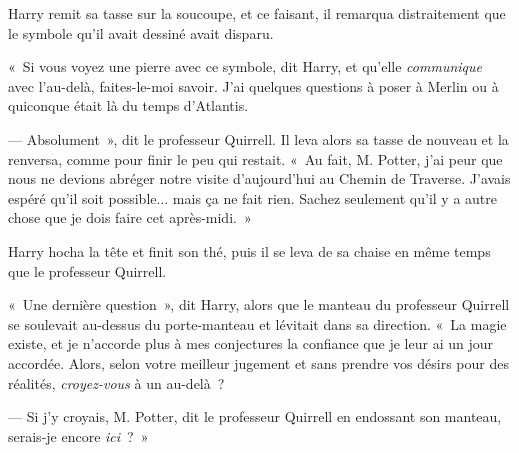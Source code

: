 Harry remit sa tasse sur la soucoupe, et ce faisant, il remarqua distraitement que le symbole qu'il avait dessiné avait disparu.

«~Si vous voyez une pierre avec ce symbole, dit Harry, et qu'elle \emph{communique} avec l'au-delà, faites-le-moi savoir. J'ai quelques questions à poser à Merlin ou à quiconque était là du temps d'Atlantis.

--- Absolument~», dit le professeur Quirrell. Il leva alors sa tasse de nouveau et la renversa, comme pour finir le peu qui restait. «~Au fait, M. Potter, j'ai peur que nous ne devions abréger notre visite d'aujourd'hui au Chemin de Traverse. J'avais espéré qu'il soit possible... mais ça ne fait rien. Sachez seulement qu'il y a autre chose que je dois faire cet après-midi.~»

Harry hocha la tête et finit son thé, puis il se leva de sa chaise en même temps que le professeur Quirrell.

«~Une dernière question~», dit Harry, alors que le manteau du professeur Quirrell se soulevait au-dessus du porte-manteau et lévitait dans sa direction. «~La magie existe, et je n'accorde plus à mes conjectures la confiance que je leur ai un jour accordée. Alors, selon votre meilleur jugement et sans prendre vos désirs pour des réalités, \emph{croyez-vous} à un au-delà~?

--- Si j'y croyais, M. Potter, dit le professeur Quirrell en endossant son manteau, serais-je encore \emph{ici}~?~»

